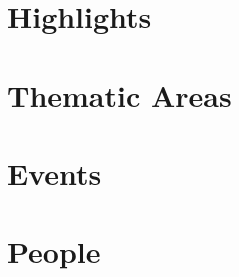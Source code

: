 \documentclass[11pt,fleqn]{book} %
\begin{document}
\chapter{Highlights}
\newpage







\chapter{Thematic Areas}
\newpage




\chapter{Events}
\newpage


\newpage
{}
\chapter{People}
\newpage
\begin{multicols}{3}
\end{multicols}
\end{document}
